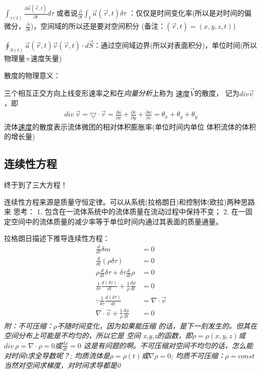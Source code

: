 \documentclass[UTF8,12pt]{article}
\begin{document}
$\int_{\tau(t)} \frac{\partial \vec a(\vec r,t)}{\partial t}d\tau$
或者说$\frac{\partial}{\partial t} \int_{t}\vec a(\vec r,t) \delta \tau$
：仅仅是时间变化率(所以是对时间的偏微分，$\frac{\partial}{\partial t}$)，空间域的所以还是要对空间积分
(备注：$(\vec r,t) = (x,y,z,t)$)

$\oint_{S(t)} \vec a(\vec r,t) \vec v(\vec r,t)\cdot d\vec S$：通过空间域边界(所以对表面积分)，单位时间(所以物理量$\times$速度矢量)

散度的物理意义：

三个相互正交方向上线变形速率之和在\emph{向量分析}上称为{\color{cyan} 速度$\vec V$}的散度，
记为$div \vec v$，即
\begin{align*}
    div ~ \vec v = \bigtriangledown \cdot \vec v 
    = \frac{\partial u}{\partial x} + \frac{\partial v}{\partial y}
    + \frac{\partial w}{\partial z}
    = \theta_x +\theta_y + \theta_y
\end{align*}
流体\uline{速度}的散度表示流体微团的相对体积膨胀率(单位时间内单位
体积流体的体积的增长量)
\subsection{连续性方程}
终于到了三大方程！

连续性方程来源是质量守恒定律。可以从系统(拉格朗日)和控制体(欧拉)两种思路来
思考：
1. 包含在一流体系统中的流体质量在流动过程中保持不变；
2. 在一固定空间中的流体质量的减少率等于单位时间内通过其表面的质量通量。

拉格朗日描述下推导连续性方程：
\begin{align*}
    \frac{d}{dt}\delta m &= 0\\
    \frac{d}{dt} (\rho \delta \tau) &= 0\\
    \rho \frac{d}{dt} \delta \tau + \delta \tau \frac{d}{dt} \rho &= 0\\
    \frac{1}{\delta \tau} \frac{d (\delta \tau)}{dt} + \frac{1}{\rho} \frac{d\rho}{dt} &= 0\\
    \because \frac{1}{\delta \tau} \frac{d (\delta \tau)}{dt} &= \nabla \cdot \vec v \\
    \nabla \cdot \vec v +\frac{1}{\rho} \frac{d\rho}{dt} &= 0
\end{align*}
\emph{附：不可压缩：$\rho$不随时间变化，因为如果能压缩
的话，是下一刻发生的。但其在空间分布上可能是不均匀的，所以它是
空间
x,y,z的函数，即$\rho = \rho(x,y,z)$或$div ~\rho = \nabla \cdot \rho = 0$或$\frac{d\rho}{dt}=0${\color{red} 这是有问题的啊。不可压缩对空间不均匀的话，怎么能对时间t求全导数呢？};
均质流体是$\rho = \rho(t)$或$\nabla \rho = 0$;
均质不可压缩：$\rho = const$当然对空间求梯度，对时间求导都是0}
\end{document}
